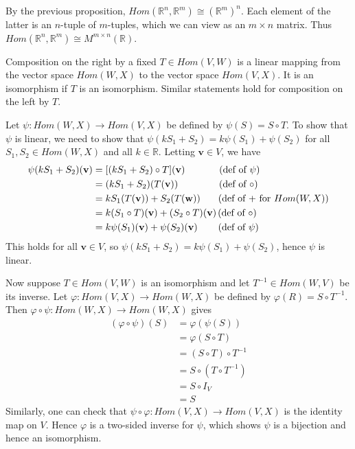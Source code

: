 \documentclass[12pt,letterpaper,reqno]{article}
\numberwithin{equation}{section}
\newcommand{\bv}{\mathbf{v}}
\newcommand{\bw}{\mathbf{w}}
\begin{document}
\begin{pf}
	By the previous proposition, $Hom(\mathbb{R}^n,\mathbb{R}^m) \cong (\mathbb{R}^m)^n$. Each element of the latter is an $n$-tuple of $m$-tuples, which we can view as an $m \times n$ matrix. Thus  $Hom(\mathbb{R}^n,\mathbb{R}^m) \cong M^{m \times n}(\mathbb{R})$.
\end{pf}

\begin{lem}
Composition on the right by a fixed $T \in Hom(V,W)$ is a linear mapping from the vector space $Hom(W,X)$ to the vector space $Hom(V,X)$. It is an isomorphism if $T$ is an isomorphism. Similar statements hold for composition on the left by $T$.
\end{lem}

\begin{pf}
	Let $\psi:Hom(W,X) \to Hom(V,X)$ be defined by $\psi(S)=S \circ T$. To show that $\psi$ is linear, we need to show that $\psi(kS_1+S_2)=k\psi(S_1)+\psi(S_2)$ for all $S_1,S_2 \in Hom(W,X)$ and all $k \in \mathbb{R}$. Letting $\bv \in V$, we have
	\begin{align*}
		\psi(kS_1+S_2)(\bv)&=[(kS_1+S_2)\circ T](\bv) \hspace{1.25cm} \text{(def of $\psi$)}\\
		&=(kS_1+S_2)(T(\bv)) \hspace{1.5cm} \text{(def of $\circ$)}\\
		&=kS_1(T(\bv))+S_2(T(\bw)) \hspace{0.65cm} \text{(def of $+$ for $Hom(W,X)$)}\\
		&=k(S_1 \circ T)(\bv)+(S_2 \circ T)(\bv) \hspace{0.05cm} \text{(def of $\circ$)}\\
		&=k\psi(S_1)(\bv)+\psi(S_2)(\bv) \hspace{0.75cm} \text{(def of $\psi$)}
	\end{align*}
	This holds for all $\bv \in V$, so $\psi(kS_1+S_2)=k\psi(S_1)+\psi(S_2)$, hence $\psi$ is linear. 
	
	Now suppose $T \in Hom(V,W)$ is an isomorphism and let $T^{-1} \in Hom(W,V)$ be its inverse. Let $\varphi: Hom(V,X) \to Hom(W,X)$ be defined by $\varphi(R)=S \circ T^{-1}$. Then $\varphi \circ \psi:Hom(W,X) \to Hom(W,X)$ gives
	\begin{align*}
		(\varphi \circ \psi)(S)&=\varphi(\psi(S)) \\
		&=\varphi(S \circ T) \\
		&=(S \circ T) \circ T^{-1} \\
		&=S \circ (T \circ T^{-1}) \\
		&=S \circ I_V \\
		&=S
	\end{align*}
	Similarly, one can check that $\psi \circ \varphi:Hom(V,X) \to Hom(V,X)$ is the identity map on $V$. Hence $\varphi$ is a two-sided inverse for $\psi$, which shows $\psi$ is a bijection and hence an isomorphism.
\end{pf}
\end{document}
